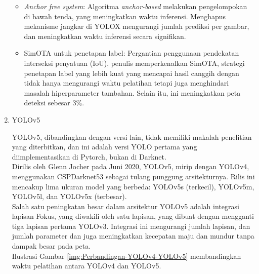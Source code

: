 \begin{enumerate}
\begin{itemize}
		\item \textit{Anchor free system}: Algoritma \textit{anchor-based} melakukan pengelompokan di bawah tenda, yang meningkatkan waktu inferensi. Menghapus mekanisme jangkar di YOLOX mengurangi jumlah prediksi per gambar, dan meningkatkan waktu inferensi secara signifikan.
		
		\item SimOTA untuk penetapan label: Pergantian penggunaan pendekatan interseksi penyatuan (IoU), penulis memperkenalkan SimOTA, strategi penetapan label yang lebih kuat yang mencapai hasil canggih dengan tidak hanya mengurangi waktu pelatihan tetapi juga menghindari masalah hiperparameter tambahan. Selain itu, ini meningkatkan peta deteksi sebesar 3\%.
		
	\end{itemize}
	
	\item YOLOv5
	
	YOLOv5, dibandingkan dengan versi lain, tidak memiliki makalah penelitian yang diterbitkan, dan ini adalah versi YOLO pertama yang diimplementasikan di Pytorch, bukan di Darknet.\\
	Dirilis oleh Glenn Jocher pada Juni 2020, YOLOv5, mirip dengan YOLOv4, menggunakan CSPDarknet53 sebagai tulang punggung arsitekturnya. Rilis ini mencakup lima ukuran model yang berbeda: YOLOv5s (terkecil), YOLOv5m, YOLOv5l, dan YOLOv5x (terbesar).\\
	Salah satu peningkatan besar dalam arsitektur YOLOv5 adalah integrasi lapisan Fokus, yang diwakili oleh satu lapisan, yang dibuat dengan mengganti tiga lapisan pertama YOLOv3. Integrasi ini mengurangi jumlah lapisan, dan jumlah parameter dan juga meningkatkan kecepatan maju dan mundur tanpa dampak besar pada peta.\\
	Ilustrasi Gambar \ref{img:Perbandingan-YOLOv4-YOLOv5} membandingkan waktu pelatihan antara YOLOv4 dan YOLOv5.
	

\end{enumerate}
